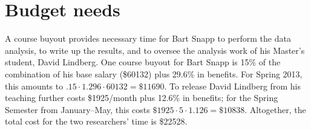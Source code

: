 \documentclass[12pt]{article}
\begin{document}
\section{Budget needs}
A course buyout provides necessary time for Bart Snapp to perform the
data analysis, to write up the results, and to oversee the analysis
work of his Master's student, David Lindberg.  One course buyout for
Bart Snapp is 15\% of the combination of his base salary (\$60132)
plus 29.6\% in benefits. For Spring 2013, this amounts to $.15 \cdot
1.296\cdot 60132=\$11690$.  To release David Lindberg from his
teaching further costs \$1925/month plus 12.6\% in benefits; for the
Spring Semester from January--May, this costs $\$1925 \cdot 5 \cdot
1.126 = \$10838$.  Altogether, the total cost for the two researchers'
time is \$22528.


\pagebreak
\printbibliography
\end{document}
